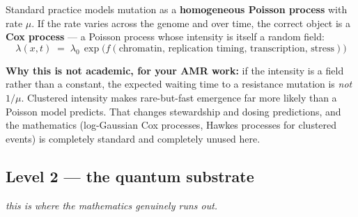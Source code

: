 \begin{tier2}[title={The wrong object, and the right one}]
Standard practice models mutation as a \textbf{homogeneous Poisson process} with rate $\mu$. If the
rate varies across the genome and over time, the correct object is a \textbf{Cox process} --- a
Poisson process whose intensity is itself a random field:
\[
\lambda(x,t)\;=\;\lambda_0\,\exp\!\big(f(\text{chromatin},\,\text{replication timing},\,\text{transcription},\,\text{stress})\big)
\]
\begin{center}
\end{center}
\vspace{-2pt}
\textbf{Why this is not academic, for your AMR work:} if the intensity is a field rather than a
constant, the expected waiting time to a resistance mutation is \emph{not} $1/\mu$. Clustered
intensity makes rare-but-fast emergence far more likely than a Poisson model predicts. That changes
stewardship and dosing predictions, and the mathematics (log-Gaussian Cox processes, Hawkes processes
for clustered events) is completely standard and completely unused here.
\end{tier2}

\subsection{Level 2 --- the quantum substrate}
\noindent\Tthree\;\emph{this is where the mathematics genuinely runs out.}\medskip

